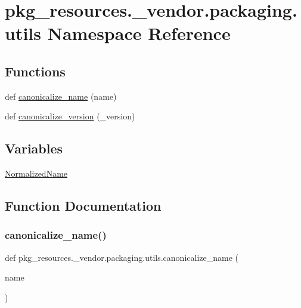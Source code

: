 \hypertarget{namespacepkg__resources_1_1__vendor_1_1packaging_1_1utils}{}\section{pkg\+\_\+resources.\+\_\+vendor.\+packaging.\+utils Namespace Reference}
\label{namespacepkg__resources_1_1__vendor_1_1packaging_1_1utils}
\subsection*{Functions}
\begin{DoxyCompactItemize}
\item 
def \hyperlink{namespacepkg__resources_1_1__vendor_1_1packaging_1_1utils_adc58ab58907e9c52b95193d8560d8e15}{canonicalize\+\_\+name} (name)
\item 
def \hyperlink{namespacepkg__resources_1_1__vendor_1_1packaging_1_1utils_ab78ef5b2e2ccebafef9143c643559dda}{canonicalize\+\_\+version} (\+\_\+version)
\end{DoxyCompactItemize}
\subsection*{Variables}
\begin{DoxyCompactItemize}
\item 
\hyperlink{namespacepkg__resources_1_1__vendor_1_1packaging_1_1utils_ad4217d09555d1591c27ff5de51c32b1a}{Normalized\+Name}
\end{DoxyCompactItemize}


\subsection{Function Documentation}
\mbox{\label{namespacepkg__resources_1_1__vendor_1_1packaging_1_1utils_adc58ab58907e9c52b95193d8560d8e15}} 
\subsubsection{\texorpdfstring{canonicalize\+\_\+name()}{canonicalize\_name()}}
{\footnotesize\ttfamily def pkg\+\_\+resources.\+\_\+vendor.\+packaging.\+utils.\+canonicalize\+\_\+name (\begin{DoxyParamCaption}\item[{}]{name }\end{DoxyParamCaption})}

